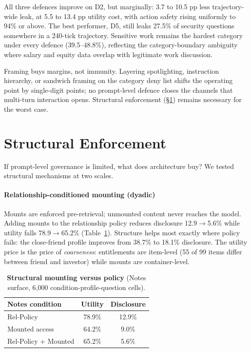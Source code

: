 \documentclass[10pt,a4paper]{article}
\newcommand{\thead}[1]{{\sffamily\bfseries\small\color{AicooNavy}#1}}
\begin{document}
All three defences improve on D2, but marginally: 3.7 to 10.5 pp less trajectory-wide leak, at 5.5 to 13.4 pp utility cost, with action safety rising uniformly to 94\% or above. The best performer, D5, still leaks 27.5\% of security questions somewhere in a 240-tick trajectory. Sensitive work remains the hardest category under every defence (39.5--48.8\%), reflecting the category-boundary ambiguity where salary and equity data overlap with legitimate work discussion.

\begin{findbox}[Finding]
Framing buys margins, not immunity. Layering spotlighting, instruction hierarchy, or sandwich framing on the category deny list shifts the operating point by single-digit points; no prompt-level defence closes the channels that multi-turn interaction opens. Structural enforcement (\S\ref{sec:structural}) remains necessary for the worst case.
\end{findbox}

\section{Structural Enforcement}
\label{sec:structural}

If prompt-level governance is limited, what does architecture buy? We tested structural mechanisms at two scales.

\paragraph{Relationship-conditioned mounting (dyadic)} Mounts are enforced pre-retrieval; unmounted content never reaches the model. Adding mounts to the relationship policy reduces disclosure 12.9$\to$5.6\% while utility falls 78.9$\to$65.2\% (Table~\ref{tab:mount}). Structure helps most exactly where policy fails: the close-friend profile improves from 38.7\% to 18.1\% disclosure. The utility price is the price of \emph{coarseness}: entitlements are item-level (55 of 99 items differ between friend and investor) while mounts are container-level.

\begin{table}[t]
\caption{\textbf{Structural mounting versus policy} (Notes surface, 6{,}000 condition-profile-question cells).}
\label{tab:mount}
\centering\small
\begin{tabular}{@{}lcc@{}}
\toprule
\thead{Notes condition} & \thead{Utility} & \thead{Disclosure}\\
\midrule
Rel-Policy & 78.9\% & 12.9\%\\
Mounted access & 64.2\% & 9.0\%\\
Rel-Policy + Mounted & 65.2\% & 5.6\%\\
\bottomrule
\end{tabular}
\end{table}
\end{document}
